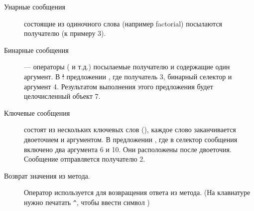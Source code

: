 \documentclass[a4paper,10pt,twoside]{book}
\begin{document}
\begin{description}
\item[Унарные сообщения] состоящие из одиночного слова (например factorial) посылаются получателю (к примеру 3).

\item[Бинарные сообщения] --- операторы (\ct{+}\ct{-}\ct{/}\ct{-}\ct{>} и т.д.) посылаемые получателю и содержащие один аргумент.
	В \st! предложении , где получатель 3, бинарный селектор \ct{+} и аргумент 4.
	Результатом выполнения этого предложения будет целочисленный объект 7.

\item[Ключевые сообщения] состоят из нескольких ключевых слов (),
	каждое слово заканчивается двоеточием и аргументом.
	В предложении , где в селектор сообщения  включено два аргумента 6 и 10.
	Они расположены после двоеточия. Сообщение отправляется получателю 2.

\item[Возврат значения из метода.] Оператор \ct{^} используется для возвращения ответа из метода.
	(На клавиатуре нужно печатать \verb|^|, чтобы ввести символ \ct{^})


\end{description}
\end{document}
